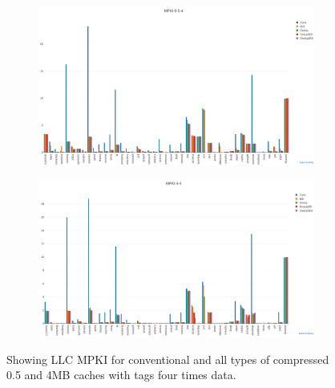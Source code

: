 \begin{figure}
    \begin{subfigure}{\textwidth}
        \includegraphics[width=\textwidth]{all05-mpki.png}
    \end{subfigure}
    \begin{subfigure}{\textwidth}
        \includegraphics[width=\textwidth]{all4-mpki.png}
    \end{subfigure}
    \caption[All benchmarks: MPKI]{Showing LLC MPKI for conventional and all types of compressed 0.5 and 4MB caches with tags four times data.}
    \label{fig:all_mpki}
\end{figure}
